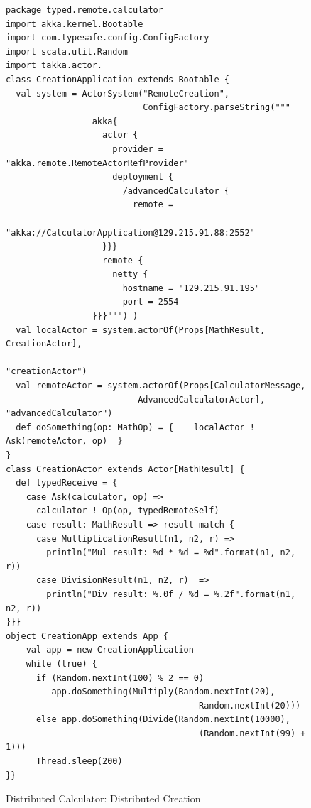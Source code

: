 \begin{figure}[p]
\begin{lstlisting}
package typed.remote.calculator
import akka.kernel.Bootable
import com.typesafe.config.ConfigFactory
import scala.util.Random
import takka.actor._
class CreationApplication extends Bootable {
  val system = ActorSystem("RemoteCreation", 
                           ConfigFactory.parseString(""" 
                 akka{
                   actor {
                     provider = "akka.remote.RemoteActorRefProvider"
                     deployment {
                       /advancedCalculator {
                         remote = 
                                "akka://CalculatorApplication@129.215.91.88:2552"
                   }}}
                   remote {
                     netty {
                       hostname = "129.215.91.195"
                       port = 2554               
                 }}}""") )
  val localActor = system.actorOf(Props[MathResult, CreationActor],
                                                    "creationActor")
  val remoteActor = system.actorOf(Props[CalculatorMessage, 
                          AdvancedCalculatorActor], "advancedCalculator")
  def doSomething(op: MathOp) = {    localActor ! Ask(remoteActor, op)  }
}
class CreationActor extends Actor[MathResult] {
  def typedReceive = {
    case Ask(calculator, op) => 
      calculator ! Op(op, typedRemoteSelf)      
    case result: MathResult => result match {
      case MultiplicationResult(n1, n2, r) => 
        println("Mul result: %d * %d = %d".format(n1, n2, r))
      case DivisionResult(n1, n2, r)  => 
        println("Div result: %.0f / %d = %.2f".format(n1, n2, r))
}}}
object CreationApp extends App {
    val app = new CreationApplication
    while (true) {
      if (Random.nextInt(100) % 2 == 0) 
         app.doSomething(Multiply(Random.nextInt(20), 
                                      Random.nextInt(20)))
      else app.doSomething(Divide(Random.nextInt(10000),
                                      (Random.nextInt(99) + 1)))
      Thread.sleep(200)
}}

\end{lstlisting}
\caption{Distributed Calculator: Distributed Creation}
\label{discal_distribute_creation}
\end{figure}

